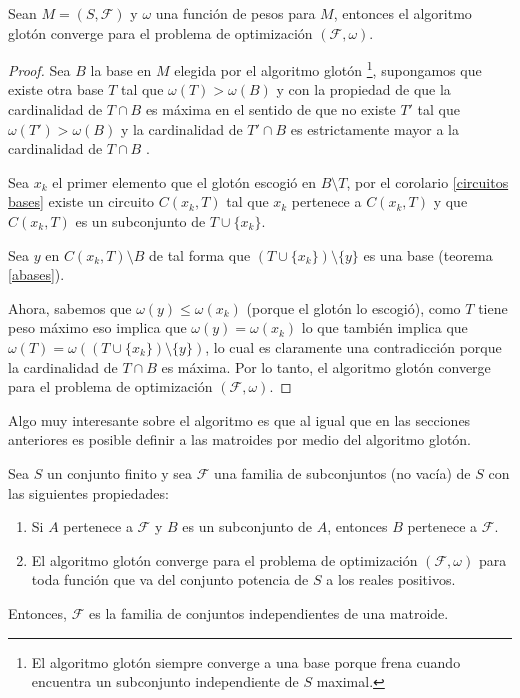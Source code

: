 \begin{teo} \label{glot}
Sean $M=(S,\mathcal{F})$ y $\omega$ una función de pesos para $M$, entonces el algoritmo glotón converge para el problema de optimización $(\mathcal{F}, \omega)$. 
\end{teo}
\begin{proof}
Sea $B$ la base en $M$ elegida por el algoritmo glotón \footnote{El algoritmo glotón siempre converge a una base porque frena cuando encuentra un subconjunto independiente de $S$ maximal.}, supongamos que existe otra base $T$ tal que $\omega(T)> \omega(B)$ y con la propiedad de que la cardinalidad de $T\cap B$ es máxima en el sentido de que no existe $T'$ tal que $\omega(T')> \omega(B)$ y la cardinalidad de $T'\cap B$ es estrictamente mayor a la cardinalidad de $T\cap B$ . 

Sea $x_k$ el primer elemento que el glotón escogió en $B \setminus T$, por el corolario \ref{circuitos bases} existe un circuito $C(x_k,T)$ tal que $x_k$ pertenece a $C(x_k,T)$ y que $C(x_k,T)$ es un subconjunto de $T \cup \{x_k\}$. 

Sea $y$ en $C(x_k,T) \setminus B$ de tal forma que $(T \cup \{x_k\}) \setminus \{y\}$ es una base (teorema \ref{abases}). 
 
Ahora, sabemos que $\omega(y)\leq \omega(x_k)$ (porque el glotón lo escogió), como $T$ tiene peso máximo eso implica que $\omega(y)=\omega(x_k)$ lo que también implica que $\omega(T)=\omega((T \cup \{x_k\}) \setminus \{y\})$, lo cual es claramente una contradicción porque la cardinalidad de $T\cap B$ es máxima. Por lo tanto, el algoritmo glotón converge para el problema de optimización $(\mathcal{F}, \omega)$.
\end{proof}

Algo muy interesante sobre el algoritmo es que al igual que en las secciones anteriores es posible definir a las matroides por medio del algoritmo glotón. 

\begin{teo} \label{axiomas gloton}
Sea $S$ un conjunto finito y sea $\mathcal{F}$ una familia de subconjuntos (no vacía) de $S$ con las siguientes propiedades:
\begin{enumerate}
\item Si $A$ pertenece a $\mathcal{F}$ y $B$ es un subconjunto de $A$, entonces $B$ pertenece a $\mathcal{F}$.
\item El algoritmo glotón converge para el problema de optimización $(\mathcal{F},\omega)$ para toda función que va del conjunto potencia de $S$ a los reales positivos.
\end{enumerate}
Entonces, $\mathcal{F}$ es la familia de conjuntos independientes de una matroide. 
\end{teo}

